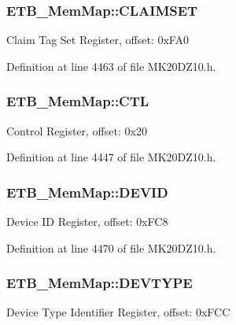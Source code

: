 \subsubsection[{\texorpdfstring{C\+L\+A\+I\+M\+S\+ET}{CLAIMSET}}]{ E\+T\+B\+\_\+\+Mem\+Map\+::\+C\+L\+A\+I\+M\+S\+ET}\hypertarget{struct_e_t_b___mem_map_a86f547f97e9ad1895c1fb03ae9c25931}{}\label{struct_e_t_b___mem_map_a86f547f97e9ad1895c1fb03ae9c25931}
Claim Tag Set Register, offset\+: 0x\+F\+A0 

Definition at line 4463 of file M\+K20\+D\+Z10.\+h.

\subsubsection[{\texorpdfstring{C\+TL}{CTL}}]{ E\+T\+B\+\_\+\+Mem\+Map\+::\+C\+TL}\hypertarget{struct_e_t_b___mem_map_a12988dd241cd1b4936f513afcd6fa803}{}\label{struct_e_t_b___mem_map_a12988dd241cd1b4936f513afcd6fa803}
Control Register, offset\+: 0x20 

Definition at line 4447 of file M\+K20\+D\+Z10.\+h.

\subsubsection[{\texorpdfstring{D\+E\+V\+ID}{DEVID}}]{ E\+T\+B\+\_\+\+Mem\+Map\+::\+D\+E\+V\+ID}\hypertarget{struct_e_t_b___mem_map_a135d6824f41332aa21abb897832a19a4}{}\label{struct_e_t_b___mem_map_a135d6824f41332aa21abb897832a19a4}
Device ID Register, offset\+: 0x\+F\+C8 

Definition at line 4470 of file M\+K20\+D\+Z10.\+h.

\subsubsection[{\texorpdfstring{D\+E\+V\+T\+Y\+PE}{DEVTYPE}}]{ E\+T\+B\+\_\+\+Mem\+Map\+::\+D\+E\+V\+T\+Y\+PE}\hypertarget{struct_e_t_b___mem_map_a7c8b85bd88e8e639a4a75216ab918c88}{}\label{struct_e_t_b___mem_map_a7c8b85bd88e8e639a4a75216ab918c88}
Device Type Identifier Register, offset\+: 0x\+F\+CC 

